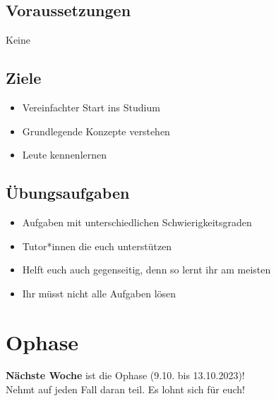 \subsection{Voraussetzungen}
\begin{frame}
    \slidehead
    \centering
    \vspace{1.5cm}
    \Huge Keine
\end{frame}

\subsection{Ziele}
\begin{frame}
    \slidehead
    \begin{itemize}
        \item Vereinfachter Start ins Studium
        \item Grundlegende Konzepte verstehen
        \item Leute kennenlernen

    \end{itemize}
\end{frame}

\subsection{Übungsaufgaben}
\begin{frame}
    \slidehead
    \begin{itemize}
        \item Aufgaben mit unterschiedlichen Schwierigkeitsgraden
        \item Tutor*innen
            die euch unterstützen
        \item Helft euch auch gegenseitig, denn so lernt ihr am meisten
        \item Ihr müsst nicht alle Aufgaben lösen
    \end{itemize}
\end{frame}

\section{Ophase}
\begin{frame}
    \slidehead
    \textbf{Nächste Woche} ist die Ophase (9.10. bis 13.10.2023)! \\
    Nehmt auf jeden Fall daran teil. Es lohnt sich für euch!
\end{frame}


